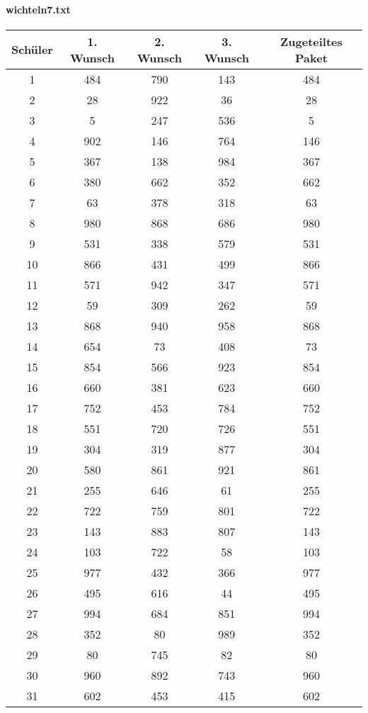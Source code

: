 \documentclass[a4paper,10pt,ngerman]{scrartcl}
\begin{document}
\paragraph{wichteln7.txt}
\begin{longtable}[c]{c|c|c|c|c}
    Schüler & 1. Wunsch & 2. Wunsch & 3. Wunsch & Zugeteiltes Paket \\
    \hline
    \endhead
    1 & 484 & 790 & 143 & 484 \\
    2 & 28 & 922 & 36 & 28 \\
    3 & 5 & 247 & 536 & 5 \\
    4 & 902 & 146 & 764 & 146 \\
    5 & 367 & 138 & 984 & 367 \\
    6 & 380 & 662 & 352 & 662 \\
    7 & 63 & 378 & 318 & 63 \\
    8 & 980 & 868 & 686 & 980 \\
    9 & 531 & 338 & 579 & 531 \\
    10 & 866 & 431 & 499 & 866 \\
    11 & 571 & 942 & 347 & 571 \\
    12 & 59 & 309 & 262 & 59 \\
    13 & 868 & 940 & 958 & 868 \\
    14 & 654 & 73 & 408 & 73 \\
    15 & 854 & 566 & 923 & 854 \\
    16 & 660 & 381 & 623 & 660 \\
    17 & 752 & 453 & 784 & 752 \\
    18 & 551 & 720 & 726 & 551 \\
    19 & 304 & 319 & 877 & 304 \\
    20 & 580 & 861 & 921 & 861 \\
    21 & 255 & 646 & 61 & 255 \\
    22 & 722 & 759 & 801 & 722 \\
    23 & 143 & 883 & 807 & 143 \\
    24 & 103 & 722 & 58 & 103 \\
    25 & 977 & 432 & 366 & 977 \\
    26 & 495 & 616 & 44 & 495 \\
    27 & 994 & 684 & 851 & 994 \\
    28 & 352 & 80 & 989 & 352 \\
    29 & 80 & 745 & 82 & 80 \\
    30 & 960 & 892 & 743 & 960 \\
    31 & 602 & 453 & 415 & 602 \\

\end{longtable}
\end{document}
